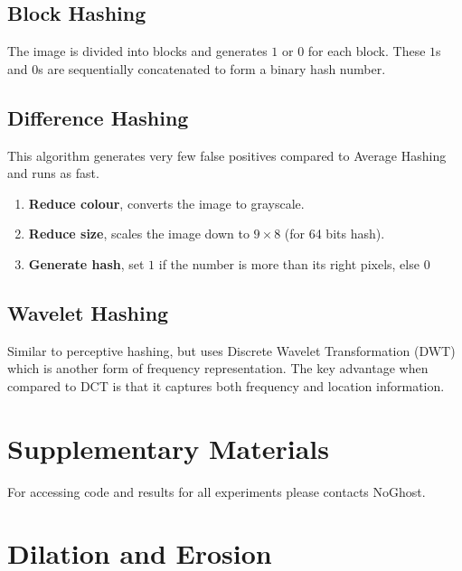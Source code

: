 \subsection{Block Hashing}
The image is divided into blocks and generates $1$ or $0$ for each block. These $1$s and $0$s are sequentially concatenated to form a binary hash number.

\subsection{Difference Hashing}
This algorithm generates very few false positives compared to Average Hashing and runs as fast.
\begin{enumerate}
    \item \textbf{Reduce colour}, converts the image to grayscale.
    \item \textbf{Reduce size}, scales the image down to $9\times8$ (for 64 bits hash).
    \item \textbf{Generate hash}, set $1$ if the number is more than its right pixels, else $0$
\end{enumerate}

\subsection{Wavelet Hashing}
Similar to perceptive hashing, but uses Discrete Wavelet Transformation (DWT) which is another form of frequency representation. The key advantage when compared to DCT is that it captures both frequency and location information\cite{DiscreteWaveletTransform2022}. 

\section{Supplementary Materials}
For accessing code and results for all experiments please contacts NoGhost.

\section{Dilation and Erosion}

